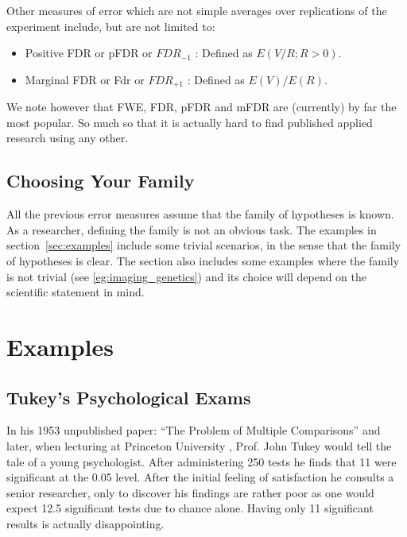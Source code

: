 \documentclass[draft,12pt]{article}
\begin{document}
Other measures of error which are not simple averages over replications of the experiment include, but are not limited to:
\begin{itemize}
\item Positive FDR or pFDR \citep{storey_direct_2002} or $FDR_{-1}$ \citep{benjamini_discovering_2010} : Defined as $E(V/R;R>0)$.
\item Marginal FDR \citep{sun_oracle_2007} or Fdr \citep{efron_microarrays_2008} or $FDR_{+1}$ \citep{benjamini_discovering_2010}: Defined as $E(V)/E(R)$.
\end{itemize}

We note however that FWE, FDR, pFDR and mFDR are (currently) by far the most popular. So much so that it is actually hard to find published applied research using any other. 



\subsection{Choosing Your Family}
All the previous error measures assume that the family of hypotheses is known. As a researcher, defining the family is not an obvious task. The examples in section~\ref{sec:examples} include some trivial scenarios, in the sense that the family of hypotheses is clear. The section also includes some examples where the family is not trivial (see \ref{eg:imaging_genetics}) and its choice will depend on the scientific statement in mind.




\section{\label{sec:examples}Examples}



\subsection{Tukey's Psychological Exams}
In his 1953 unpublished paper: ``The Problem of Multiple Comparisons'' \citep{benjamini_john_2002} and later, when lecturing at Princeton University \citep{donoho_higher_2004}, Prof. John Tukey would tell the tale of a young psychologist. After administering 250 tests he finds that 11 were significant at the 0.05 level. After the initial feeling of satisfaction he consults a senior researcher, only to discover his findings are rather poor as one  would expect 12.5 significant tests due to chance alone. Having only 11 significant results is actually disappointing.
\end{document}
